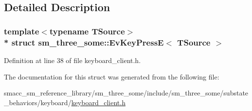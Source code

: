 \subsection{Detailed Description}
\subsubsection*{template$<$typename T\+Source$>$\\*
struct sm\+\_\+three\+\_\+some\+::\+Ev\+Key\+Press\+E$<$ T\+Source $>$}



Definition at line 38 of file keyboard\+\_\+client.\+h.



The documentation for this struct was generated from the following file\+:\begin{DoxyCompactItemize}
\item 
smacc\+\_\+sm\+\_\+reference\+\_\+library/sm\+\_\+three\+\_\+some/include/sm\+\_\+three\+\_\+some/substate\+\_\+behaviors/keyboard/\hyperlink{keyboard__client_8h}{keyboard\+\_\+client.\+h}\end{DoxyCompactItemize}
